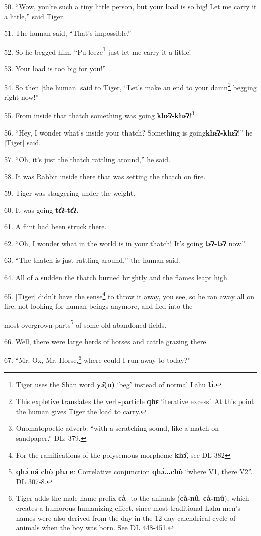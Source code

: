 50. ``Wow, you're such a tiny little person, but your load is so big! Let me carry
it a little,'' said Tiger.

51. The human said, ``That's impossible.''

52. So he begged him, ``Pu-leeze\footnote{Tiger uses the Shan word \textbf{yɔ̂(n)} `beg' instead of normal Lahu \textbf{lɔ̀}.} just let me carry it a little!

53. Your load is too big for you!''

54. So then [the human] said to Tiger, ``Let's make an end to your damn\footnote{This expletive translates the verb-particle \textbf{qhɛ} `iterative excess'. At this point the human gives Tiger the load to carry.} begging
right now!''

55. From inside that thatch something was going \textbf{khɛ̂ʔ-khɛ̂ʔ}!\footnote{Onomatopoetic adverb: ``with a scratching sound, like a match on sandpaper.'' DL: 379.}

56. ``Hey, I wonder what's inside your thatch? Something is going\textbf{khɛ̂ʔ-khɛ̂ʔ}!''
he [Tiger] said.

57. ``Oh, it's just the thatch rattling around,'' he said.

58. It was Rabbit inside there that was setting the thatch on fire.

59. Tiger was staggering under the weight.

60. It was going \textbf{tɛ̂ʔ-tɛ̂ʔ.}

61. A flint had been struck there.

62. ``Oh, I wonder what in the world is in your thatch! It's going \textbf{tɛ̂ʔ-tɛ̂ʔ}
now.''

63. ``The thatch is just rattling around,'' the human said.

64. All of a sudden the thatch burned brightly and the flames leapt high.

65. [Tiger] didn't have the sense\footnote{For the ramifications of the polysemous morpheme \textbf{khɔ̂}, see DL 382} to throw it away, you see, so he ran away
all on fire, not looking for human beings anymore, and fled into the

most overgrown parts\footnote{\textbf{qhɔ̀} \textbf{ná} \textbf{chò} \textbf{phɔ} \textbf{e}: Correlative conjunction \textbf{qhɔ̀...chò }``where V1, there V2''. DL 307-8.} of some old abandoned fields.

66. Well, there were large herds of horses and cattle grazing there.

67. ``Mr. Ox, Mr. Horse,\footnote{Tiger adds the male-name prefix \textbf{cà}- to the animals (\textbf{cà-nû}, \textbf{cà-mû}), which creates a humorous humanizing effect, since most traditional Lahu men's names were also derived from the day in the 12-day calendrical cycle of animals when the boy was born. See DL 448-451.} where could I run away to today?''

